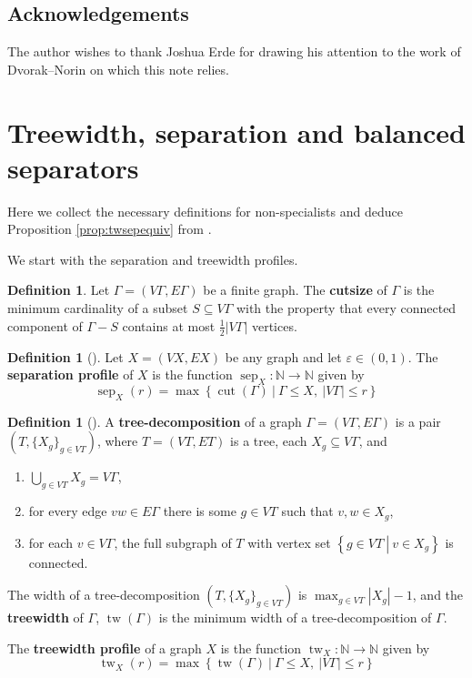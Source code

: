 \documentclass{article}
\numberwithin{equation}{section}
\theoremstyle{definition}
\newtheorem{definition}[equation]{Definition}
\theoremstyle{citing}
\DeclareMathOperator{\tw}{tw}
\DeclareMathOperator{\cut}{cut}
\DeclareMathOperator{\sep}{sep}
\newcommand{\setcon}[2]{\left\{#1\ \left|\ #2\right.\right\}}
\newcommand{\N}{\mathbb{N}}
\numberwithin{equation}{section}
\begin{document}
\subsection*{Acknowledgements}
The author wishes to thank Joshua Erde for drawing his attention to the work of Dvorak--Norin on which this note relies.


\section{Treewidth, separation and balanced separators}

Here we collect the necessary definitions for non-specialists and deduce Proposition \ref{prop:twsepequiv} from \cite[Theorem 1]{Dvorak-Norin}.

We start with the separation and treewidth profiles.

\begin{definition} Let $\Gamma=(V\Gamma,E\Gamma)$ be a finite graph. The \textbf{cutsize} of $\Gamma$ is the minimum cardinality of a subset $S\subseteq V\Gamma$ with the property that every connected component of $\Gamma-S$ contains at most $\frac12|V\Gamma|$ vertices.    
\end{definition}

\begin{definition}[\cite{BenSchTim-12-separation-graphs}]\label{defn:sep}
    Let $X=(VX,EX)$ be any graph and let $\varepsilon\in (0,1)$. The \textbf{separation profile} of $X$ is the function $\sep_X:\N\to\N$ given by
    \[
        \sep_X(r) = \max\setcon{\cut(\Gamma)}{\Gamma\leq X,\ |V\Gamma|\leq r}
    \]
\end{definition}

\begin{definition}[\cite{RobSey_tw}] \label{defn:tw}
A \textbf{tree-decomposition} of a graph $\Gamma=(V\Gamma,E\Gamma)$ is a pair $(T,\{X_g\}_{g\in VT})$, where $T=(VT,ET)$ is a tree, each $X_g\subseteq V\Gamma$, and
\begin{enumerate}
    \item $\bigcup_{g\in VT} X_g=V\Gamma$,
    \item for every edge $vw\in E\Gamma$ there is some $g\in VT$ such that $v,w\in X_g$,
    \item for each $v\in V\Gamma$, the full subgraph of $T$ with vertex set $\setcon{g\in VT}{v\in X_g}$ is connected.
\end{enumerate}
The width of a tree-decomposition $(T,\{X_g\}_{g\in VT})$ is $\max_{g\in VT} |X_g|-1$, and the \textbf{treewidth} of $\Gamma$, $\tw(\Gamma)$ is the minimum width of a tree-decomposition of $\Gamma$.

The \textbf{treewidth profile} of a graph $X$ is the function $\tw_X:\N\to\N$ given by
\[
    \tw_X(r) = \max\setcon{\tw(\Gamma)}{\Gamma\leq X,\ |V\Gamma|\leq r}
\]
\end{definition}
\end{document}

